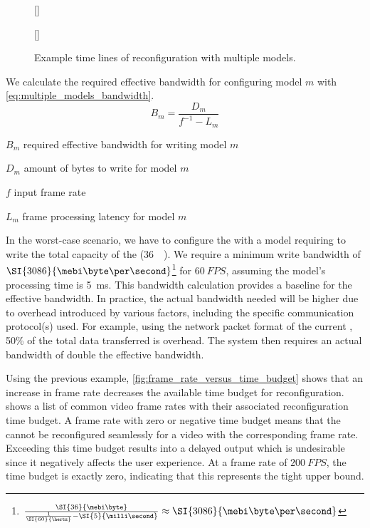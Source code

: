 \begin{figure}[hbtp]
    \centering
    [\textwidth]{
        
    }
    [\textwidth]{
        
    }
    \caption{
        Example time lines of reconfiguration with multiple models.
    }
    \label{fig:reconfig_time_line_ex}
\end{figure}

We calculate the required effective bandwidth for configuring model $m$ with \cref{eq:multiple_models_bandwidth}.
\begin{equation}
    B_m = \frac{D_m}{f^{-1} - L_m}
    \label{eq:multiple_models_bandwidth}
\end{equation}

\begin{eqexpl}[15mm]
    \item{$B_m$} required effective bandwidth for writing model $m$
    \item{$D_m$} amount of bytes to write for model $m$
    \item{$f$} input frame rate
    \item{$L_m$} frame processing latency for model $m$
\end{eqexpl}

In the worst-case scenario, we have to configure the \graicore{} with a model requiring to write the total capacity of the \graicore{} (\SI{36}{\mebi\byte}).
We require a minimum write bandwidth of $\SI{3086}{\mebi\byte\per\second}$\footnote{$\frac{\SI{36}{\mebi\byte}}{\frac{1}{\SI{60}{\hertz}} - \SI{5}{\milli\second}} \approx \SI{3086}{\mebi\byte\per\second}$} for $\SI{60}{FPS}$, assuming the model's processing time is \SI{5}{ms}.
This bandwidth calculation provides a baseline for the effective bandwidth.
In practice, the actual bandwidth needed will be higher due to overhead introduced by various factors, including the specific communication protocol(s) used.
For example, using the network packet format of the current \confignoc{}, 50\% of the total data transferred is overhead.
The system then requires an actual bandwidth of double the effective bandwidth.

Using the previous example, \cref{fig:frame_rate_versus_time_budget} shows that an increase in frame rate decreases the available time budget for reconfiguration.
 shows a list of common video frame rates with their associated reconfiguration time budget.
A frame rate with zero or negative time budget means that the \graicore{} cannot be reconfigured seamlessly for a video with the corresponding frame rate.
Exceeding this time budget results into a delayed output which is undesirable since it negatively affects the user experience.
At a frame rate of $\SI{200}{FPS}$, the time budget is exactly zero, indicating that this represents the tight upper bound.

